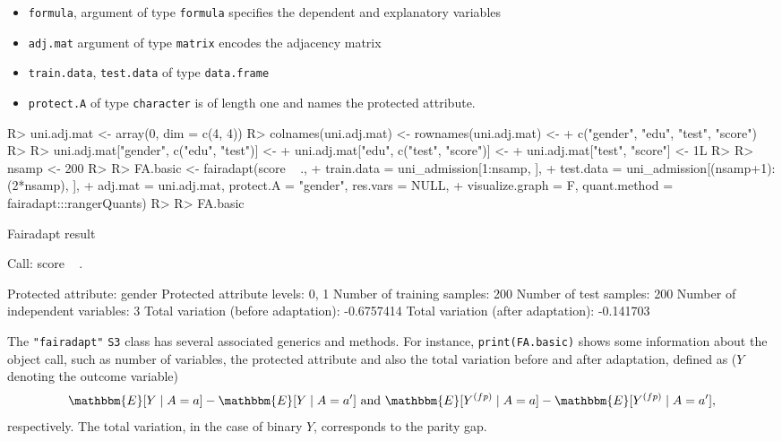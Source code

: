 \documentclass[
  notitle]{jss}
\providecommand{\tightlist}{%
  \setlength{\itemsep}{0pt}\setlength{\parskip}{0pt}}
\begin{document}
\begin{itemize}
\tightlist
\item
  \texttt{formula}, argument of type \texttt{formula} specifies the
  dependent and explanatory variables
\item
  \texttt{adj.mat} argument of type \texttt{matrix} encodes the
  adjacency matrix
\item
  \texttt{train.data}, \texttt{test.data} of type \texttt{data.frame}
\item
  \texttt{protect.A} of type \texttt{character} is of length one and
  names the protected attribute.
\end{itemize}

\begin{CodeChunk}
\begin{CodeInput}
R> uni.adj.mat <- array(0, dim = c(4, 4))
R> colnames(uni.adj.mat) <- rownames(uni.adj.mat) <-
+   c("gender", "edu", "test", "score")
R> 
R> uni.adj.mat["gender", c("edu", "test")] <-
+   uni.adj.mat["edu", c("test", "score")] <-
+   uni.adj.mat["test", "score"] <- 1L
R> 
R> nsamp <- 200
R> 
R> FA.basic <- fairadapt(score ~ .,
+   train.data = uni_admission[1:nsamp, ],
+   test.data = uni_admission[(nsamp+1):(2*nsamp), ],
+   adj.mat = uni.adj.mat, protect.A = "gender", res.vars = NULL,
+   visualize.graph = F, quant.method = fairadapt:::rangerQuants)
R> 
R> FA.basic
\end{CodeInput}
\begin{CodeOutput}
Fairadapt result

Call:
 score ~ . 

Protected attribute:                  gender 
Protected attribute levels:           0, 1 
Number of training samples:           200 
Number of test samples:               200 
Number of independent variables:      3 
Total variation (before adaptation):  -0.6757414 
Total variation (after adaptation):   -0.141703 
\end{CodeOutput}
\end{CodeChunk}

The \texttt{"fairadapt"} \texttt{S3} class has several associated
generics and methods. For instance, \texttt{print(FA.basic)} shows some
information about the object call, such as number of variables, the
protected attribute and also the total variation before and after
adaptation, defined as (\(Y\) denoting the outcome variable)
\[\mathbbm{E}[Y \mid A = a] - \mathbbm{E}[Y \mid A = a'] \text{ and } \mathbbm{E}[ {Y}^{(fp)} \mid A = a] - \mathbbm{E}[ {Y}^{(fp)} \mid A = a'],\]
respectively. The total variation, in the case of binary \(Y\),
corresponds to the parity gap.
\end{document}
